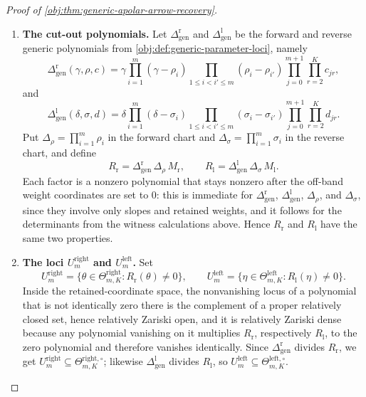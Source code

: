 \documentclass[11pt]{article}
\begin{document}
\begin{proof}[Proof of \cref{obj:thm:generic-apolar-arrow-recovery}]
\begin{enumerate}
\item \textbf{The cut-out polynomials.}  Let \(\Delta_{\mathrm{gen}}^{\mathrm r}\) and \(\Delta_{\mathrm{gen}}^{\mathrm l}\) be the forward and reverse generic polynomials from \cref{obj:def:generic-parameter-loci}, namely
\[
\Delta_{\mathrm{gen}}^{\mathrm r}(\gamma,\rho,c)
=\gamma\prod_{i=1}^m(\gamma-\rho_i)\prod_{1\le i<i'\le m}(\rho_i-\rho_{i'})
\prod_{j=0}^{m+1}\prod_{r=2}^{K}c_{jr},
\]
and
\[
\Delta_{\mathrm{gen}}^{\mathrm l}(\delta,\sigma,d)
=\delta\prod_{i=1}^m(\delta-\sigma_i)\prod_{1\le i<i'\le m}(\sigma_i-\sigma_{i'})
\prod_{j=0}^{m+1}\prod_{r=2}^{K}d_{jr}.
\]
Put \(\Delta_\rho=\prod_{i=1}^m\rho_i\) in the forward chart and \(\Delta_\sigma=\prod_{i=1}^m\sigma_i\) in the reverse chart, and define
\[
R_{\mathrm r}=\Delta_{\mathrm{gen}}^{\mathrm r}\,\Delta_\rho\,M_{\mathrm r},
\qquad
R_{\mathrm l}=\Delta_{\mathrm{gen}}^{\mathrm l}\,\Delta_\sigma\,M_{\mathrm l}.
\]
Each factor is a nonzero polynomial that stays nonzero after the off-band weight coordinates are set to \(0\): this is immediate for \(\Delta_{\mathrm{gen}}^{\mathrm r}\), \(\Delta_{\mathrm{gen}}^{\mathrm l}\), \(\Delta_\rho\), and \(\Delta_\sigma\), since they involve only slopes and retained weights, and it follows for the determinants from the witness calculations above.  Hence \(R_{\mathrm r}\) and \(R_{\mathrm l}\) have the same two properties.

\item \textbf{The loci \(U^{\mathrm{right}}_m\) and \(U^{\mathrm{left}}_m\).}  Set
\[
U^{\mathrm{right}}_m=\bigl\{\theta\in\Theta^{\mathrm{right}}_{m,K}:R_{\mathrm r}(\theta)\ne0\bigr\},
\qquad
U^{\mathrm{left}}_m=\bigl\{\eta\in\Theta^{\mathrm{left}}_{m,K}:R_{\mathrm l}(\eta)\ne0\bigr\}.
\]
Inside the retained-coordinate space, the nonvanishing locus of a polynomial that is not identically zero there is the complement of a proper relatively closed set, hence relatively Zariski open, and it is relatively Zariski dense because any polynomial vanishing on it multiplies \(R_{\mathrm r}\), respectively \(R_{\mathrm l}\), to the zero polynomial and therefore vanishes identically.  Since \(\Delta_{\mathrm{gen}}^{\mathrm r}\) divides \(R_{\mathrm r}\), we get \(U^{\mathrm{right}}_m\subseteq\Theta^{\mathrm{right},\circ}_{m,K}\); likewise \(\Delta_{\mathrm{gen}}^{\mathrm l}\) divides \(R_{\mathrm l}\), so \(U^{\mathrm{left}}_m\subseteq\Theta^{\mathrm{left},\circ}_{m,K}\).


\end{enumerate}
\end{proof}
\end{document}
